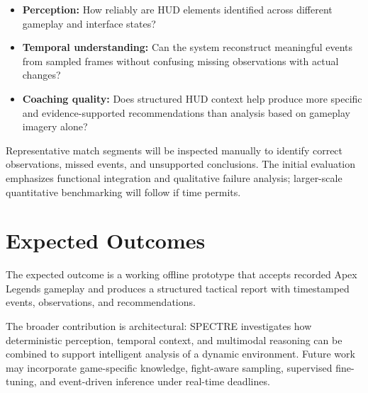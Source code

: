 \documentclass[10pt,letterpaper]{article}
\begin{document}
\begin{itemize}
    \item \textbf{Perception:} How reliably are HUD elements identified
    across different gameplay and interface states?
    \item \textbf{Temporal understanding:} Can the system reconstruct
    meaningful events from sampled frames without confusing missing
    observations with actual changes?
    \item \textbf{Coaching quality:} Does structured HUD context help
    produce more specific and evidence-supported recommendations than
    analysis based on gameplay imagery alone?
\end{itemize}

Representative match segments will be inspected manually to identify
correct observations, missed events, and unsupported conclusions.
The initial evaluation emphasizes functional integration and
qualitative failure analysis; larger-scale quantitative benchmarking
will follow if time permits.

\section{Expected Outcomes}

The expected outcome is a working offline prototype that accepts
recorded Apex Legends gameplay and produces a structured tactical
report with timestamped events, observations, and recommendations.

The broader contribution is architectural: SPECTRE investigates how
deterministic perception, temporal context, and multimodal reasoning
can be combined to support intelligent analysis of a dynamic
environment. Future work may incorporate game-specific knowledge,
fight-aware sampling, supervised fine-tuning, and event-driven
inference under real-time deadlines.
\end{document}
